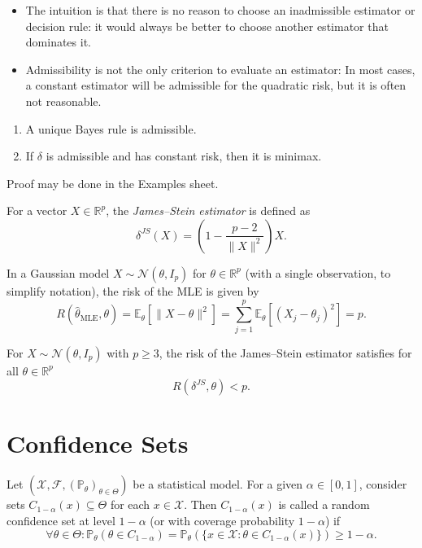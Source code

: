 \documentclass[open=any, 11pt,paper=A4]{scrreprt}
\begin{document}
\begin{remark}
\begin{itemize}
    \item The intuition is that there is no reason to choose an inadmissible estimator or decision rule: it would always be better to choose another estimator that dominates it.
    \item Admissibility is not the only criterion to evaluate an estimator: In most cases, a constant estimator will be admissible for the quadratic risk, but it is often not reasonable.
\end{itemize}
\end{remark}

\begin{proposition}
\begin{enumerate}
    \item A unique Bayes rule is admissible.
    \item If \(\delta\) is admissible and has constant risk, then it is minimax.
\end{enumerate}
\end{proposition}

Proof may be done in the Examples sheet.

\begin{definition}
For a vector \(X \in \mathbb{R}^p\), the \emph{James–Stein estimator} is defined as
\[
\delta^{JS}(X) = \left(1 - \frac{p - 2}{\|X\|^2}\right) X.
\]
\end{definition}

In a Gaussian model \(X \sim \mathcal{N}(\theta, I_p)\) for \(\theta \in \mathbb{R}^p\) (with a single observation, to simplify notation), the risk of the MLE is given by
\[
R(\hat{\theta}_{\text{MLE}}, \theta) = \mathbb{E}_{\theta}[\|X - \theta\|^2] = \sum_{j=1}^p \mathbb{E}_{\theta}[(X_j - \theta_j)^2] = p.
\]

For \( X \sim \mathcal{N}(\theta, I_p) \) with \( p \geq 3 \), the risk of the James–Stein estimator satisfies for all \( \theta \in \mathbb{R}^p \)
\[
R(\delta^{JS}, \theta) < p.
\]

\chapter{Confidence Sets}

\begin{definition}
Let \((\mathcal{X}, \mathcal{F}, (\mathbb{P}_{\theta})_{\theta \in \Theta})\) be a statistical model. For a given \(\alpha \in [0,1]\), consider sets \( C_{1-\alpha}(x) \subseteq \Theta \) for each \( x \in \mathcal{X} \). Then \( C_{1-\alpha}(x) \) is called a random confidence set at level \( 1 - \alpha \) (or with coverage probability \( 1 - \alpha \)) if
\[
\forall \theta \in \Theta : \mathbb{P}_{\theta}(\theta \in C_{1-\alpha}) = \mathbb{P}_{\theta}( \{ x \in \mathcal{X} : \theta \in C_{1-\alpha}(x) \}) \geq 1 - \alpha.
\]
\end{definition}
\end{document}
